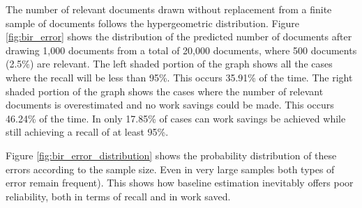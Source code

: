 \documentclass{bmcart}
\begin{document}
	The number of relevant documents drawn without replacement from a finite sample of documents follows the hypergeometric distribution. 
	Figure \ref{fig:bir_error} shows the distribution of the predicted number of documents after drawing 1,000 documents from a total of 20,000 documents, where 500 documents (2.5\%) are relevant. The left shaded portion of the graph shows all the cases where the recall will be less than 95\%. This occurs 35.91\% of the time. The right shaded portion of the graph shows the cases where the number of relevant documents is overestimated and no work savings could be made. This occurs 46.24\% of the time. In only 17.85\% of cases can work savings be achieved while still achieving a recall of at least 95\%. 
	
	Figure \ref{fig:bir_error_distribution} shows the probability distribution of these errors according to the sample size. Even in very large samples both types of error remain frequent).
	This shows how baseline estimation inevitably offers poor reliability, both in terms of recall and in work saved.
\end{document}
